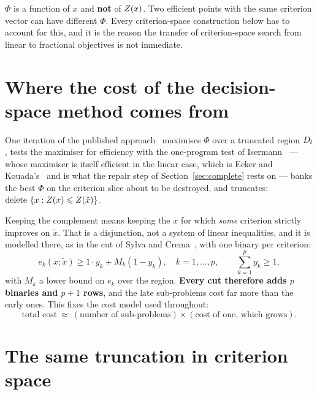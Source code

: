 \documentclass[11pt,a4paper]{article}
\begin{document}
\begin{remark}\label{rem:notZ}
$\Phi$ is a function of $x$ and \textbf{not} of $Z(x)$.  Two efficient points
with the same criterion vector can have different $\Phi$.  Every criterion-space
construction below has to account for this, and it is the reason the transfer
of criterion-space search from linear to fractional objectives is not
immediate.
\end{remark}

\section{Where the cost of the decision-space method comes from}
\label{sec:cost}

One iteration of the published approach~\cite{younsiabbaci2025} maximises
$\Phi$ over a truncated region $D_l$, tests the maximiser for efficiency
with the one-program test of Isermann~\cite{isermann1974} --- whose
maximiser is itself efficient in the linear case, which is Ecker and
Kouada's~\cite{eckerkouada} and is what the repair step of
Section~\ref{sec:complete} rests on --- banks the best $\Phi$ on the
criterion slice about to be destroyed, and truncates:
$\text{delete } \{x : Z(x) \leqslant Z(\tilde x)\}$.

Keeping the complement means keeping the $x$ for which \emph{some} criterion
strictly improves on $\tilde x$.  That is a disjunction, not a system of linear
inequalities, and it is modelled there, as in the cut of Sylva and
Crema~\cite{sylvacrema}, with one binary per criterion:
\begin{equation}\label{eq:cut}
  e_k(x;\tilde x) \geqslant 1 \cdot y_k + M_k (1 - y_k), \quad k = 1,\dots,p,
  \qquad \sum_{k=1}^{p} y_k \geqslant 1 ,
\end{equation}
with $M_k$ a lower bound on $e_k$ over the region.  \textbf{Every cut therefore
adds $p$ binaries and $p+1$ rows}, and the late sub-problems cost far more than
the early ones.  This fixes the cost model used throughout:
\[
  \text{total cost} \ \approx\ (\text{number of sub-problems})
  \times (\text{cost of one, which grows}) .
\]

\section{The same truncation in criterion space}
\label{sec:box}
\end{document}
